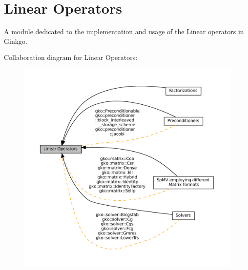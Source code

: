 \hypertarget{group__LinOp}{}\section{Linear Operators}
\label{group__LinOp}


A module dedicated to the implementation and usage of the Linear operators in Ginkgo.  


Collaboration diagram for Linear Operators\+:
\nopagebreak
\begin{figure}[H]
\begin{center}
\leavevmode
\includegraphics[width=350pt]{group__LinOp}
\end{center}
\end{figure}
